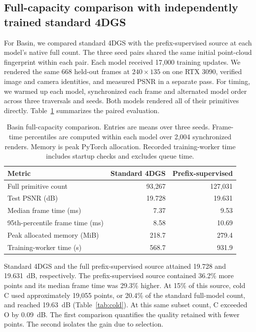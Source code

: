 \subsection{Full-capacity comparison with independently trained standard 4DGS}\label{sec:basin_native}
For Basin, we compared standard 4DGS with the prefix-supervised source at each model's native full count. The three seed pairs shared the same initial point-cloud fingerprint within each pair. Each model received 17,000 training updates. We rendered the same 668 held-out frames at $240\times135$ on one RTX 3090, verified image and camera identities, and measured PSNR in a separate pass. For timing, we warmed up each model, synchronized each frame and alternated model order across three traversals and seeds. Both models rendered all of their primitives directly. Table~\ref{tab:basin_native} summarizes the paired evaluation.

\begin{table}[!htbp]\centering\small\caption{Basin full-capacity comparison. Entries are means over three seeds. Frame-time percentiles are computed within each model over 2,004 synchronized renders. Memory is peak PyTorch allocation. Recorded training-worker time includes startup checks and excludes queue time.}\label{tab:basin_native}\begin{tabular}{lrr}\toprule
Metric & Standard 4DGS & Prefix-supervised \\\midrule
Full primitive count & 93,267 & 127,031 \\
Test PSNR (dB) & 19.728 & 19.631 \\
Median frame time (ms) & 7.37 & 9.53 \\
95th-percentile frame time (ms) & 8.58 & 10.69 \\
Peak allocated memory (MiB) & 218.7 & 279.4 \\
Training-worker time (s) & 568.7 & 931.9 \\
\bottomrule\end{tabular}\end{table}

Standard 4DGS and the full prefix-supervised source attained 19.728 and 19.631~dB, respectively. The prefix-supervised source contained 36.2\% more points and its median frame time was 29.3\% higher. At 15\% of this source, cold C used approximately 19,055 points, or 20.4\% of the standard full-model count, and reached 19.63~dB (Table~\ref{tab:cold}). At this same subset count, C exceeded O by 0.09~dB. The first comparison quantifies the quality retained with fewer points. The second isolates the gain due to selection.
